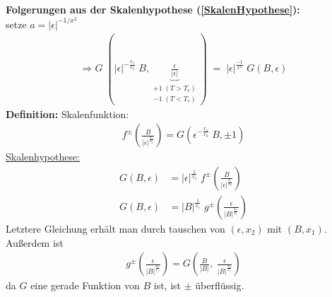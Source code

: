 \documentclass[12pt]{article}
\begin{document}
\textbf{Folgerungen aus der Skalenhypothese (\ref{SkalenHypothese}):} \\
setze $ a= \vert \epsilon \vert ^{-1/x^2}$
\begin{align}
\Rightarrow G\; (\vert \epsilon \vert ^{-\frac{x_1}{x_2}} \;  B, \underbrace{ \frac{\epsilon}{\vert \epsilon \vert}}_{\substack{ +1 \; (T>T_c) \\ -1 \; (T<T_c)}} ) \; = \; \vert \epsilon \vert^\frac{-1}{x^2} \; G(B, \epsilon)
\end{align}
\textbf{Definition:} Skalenfunktion: 
\begin{align}
f^\pm \left( \frac{B}{\vert \epsilon \vert ^\frac{x_1}{x_2}} \right) = G \left( \epsilon^{-\frac{x_1}{x_2}} \; B, \pm 1 \right)
\end{align} 
\underline{Skalenhypothese:}
\begin{align}
G(B,\epsilon) &= \vert \epsilon \vert ^\frac{1}{x_2} \; f^\pm \left( \frac{B}{\vert \epsilon \vert ^\frac{x_1}{x_2}} \right) \\
G(B,\epsilon) &= \vert B \vert ^\frac{1}{x_1} \; g^\pm \left( \frac{\epsilon}{\vert B \vert ^\frac{x_2}{x_1}} \right)
\end{align}
Letztere Gleichung erhält man durch tauschen von $(\epsilon, x_2)$ mit $(B,x_1)$. Außerdem ist
\begin{align*}
g^\pm \left( \frac{\epsilon}{\vert B \vert ^\frac{x_2}{x_1}} \right) = G\left( \frac{B}{\vert B \vert }, \; \frac{\epsilon}{\vert B \vert^\frac{x_2}{x_1}}\right)
\end{align*}
da $G$ eine gerade Funktion von $B$ ist, ist $\pm$ überflüssig.\\
\end{document}
